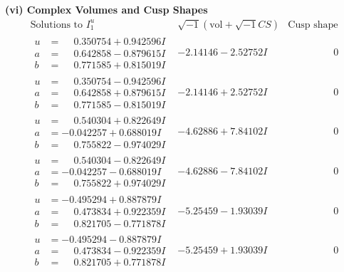 \documentclass[1p]{elsarticle_modified}
\theoremstyle{definition}
\newcommand{\I}{\sqrt{-1}}
\begin{document}
\newpage\flushleft \textbf{(vi) Complex Volumes and Cusp Shapes}
$$\begin{array}{c|c|c}  
\text{Solutions to }I^u_{1}& \I (\text{vol} + \sqrt{-1}CS) & \text{Cusp shape}\\
 \hline 
\begin{aligned}
u &= \phantom{-}0.350754 + 0.942596 I \\
a &= \phantom{-}0.642858 - 0.879615 I \\
b &= \phantom{-}0.771585 + 0.815019 I\end{aligned}
 & -2.14146 - 2.52752 I & \phantom{-0.000000 } 0 \\ \hline\begin{aligned}
u &= \phantom{-}0.350754 - 0.942596 I \\
a &= \phantom{-}0.642858 + 0.879615 I \\
b &= \phantom{-}0.771585 - 0.815019 I\end{aligned}
 & -2.14146 + 2.52752 I & \phantom{-0.000000 } 0 \\ \hline\begin{aligned}
u &= \phantom{-}0.540304 + 0.822649 I \\
a &= -0.042257 + 0.688019 I \\
b &= \phantom{-}0.755822 - 0.974029 I\end{aligned}
 & -4.62886 + 7.84102 I & \phantom{-0.000000 } 0 \\ \hline\begin{aligned}
u &= \phantom{-}0.540304 - 0.822649 I \\
a &= -0.042257 - 0.688019 I \\
b &= \phantom{-}0.755822 + 0.974029 I\end{aligned}
 & -4.62886 - 7.84102 I & \phantom{-0.000000 } 0 \\ \hline\begin{aligned}
u &= -0.495294 + 0.887879 I \\
a &= \phantom{-}0.473834 + 0.922359 I \\
b &= \phantom{-}0.821705 - 0.771878 I\end{aligned}
 & -5.25459 - 1.93039 I & \phantom{-0.000000 } 0 \\ \hline\begin{aligned}
u &= -0.495294 - 0.887879 I \\
a &= \phantom{-}0.473834 - 0.922359 I \\
b &= \phantom{-}0.821705 + 0.771878 I\end{aligned}
 & -5.25459 + 1.93039 I & \phantom{-0.000000 } 0 \\ \hline\begin{aligned}

\end{aligned}
\end{array}$$
\end{document}
